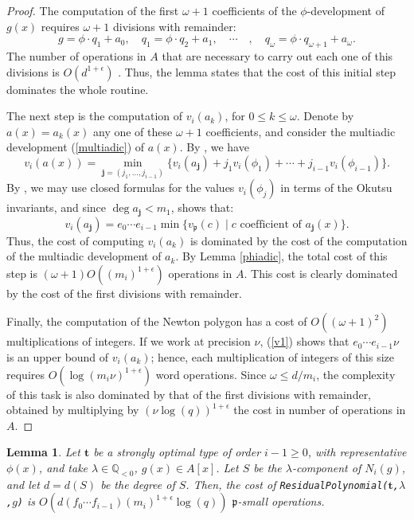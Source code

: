 \documentclass{amsart}
\newtheorem{lemma}[theorem]{Lemma}
\begin{document}
\begin{proof}
The computation of the first $\omega+1$ coefficients of the $\phi$-development of $g(x)$ requires $\omega+1$ divisions with remainder:
$$
g=\phi\cdot q_1+a_0,\quad
q_1=\phi\cdot q_2+a_1,\quad
\cdots\quad,\quad 
q_\omega=\phi\cdot q_{\omega+1}+a_\omega.
$$
The number of operations in $A$ that are necessary to carry out each one of this divisions is $O(d^{1+\epsilon})$ \cite[Thm. 9.6]{vzGG}. Thus, the lemma states that the cost of this initial step dominates the whole routine.
 
The next step is the computation of $v_i(a_k)$, for $0\le k\le \omega$. Denote by $a(x)=a_k(x)$ any one of these $\omega+1$ coefficients, and consider the multiadic development (\ref{multiadic}) of $a(x)$.
By \cite[Lem. 4.2]{bases}, we have 
\begin{equation}\label{v1}
v_i(a(x))=\min_{{\mathbf{j}}=(j_1,\dots,j_{i-1})}\{v_i(a_{\mathbf{j}})+j_1v_i(\phi_1)+\cdots+j_{i-1}v_i(\phi_{i-1})\}.
\end{equation}
By \cite[Prop. 2.15]{HN}, we may use closed formulas for the values $v_i(\phi_j)$ in terms of the Okutsu invariants, and since $\deg a_{\mathbf{j}}<m_1$, \cite[Prop. 2.7]{HN} shows that:
$$
v_i(a_{\mathbf{j}})=e_0\cdots e_{i-1}\min\{v_{\mathfrak{p}}(c)\mid c\mbox{ coefficient of }a_{\mathbf{j}}(x)\}. 
$$
Thus, the cost of computing $v_i(a_k)$ is dominated by the cost of the computation of the multiadic development of $a_k$. By Lemma \ref{phiadic}, the total cost of this step  is $(\omega+1)O\left((m_i)^{1+\epsilon}\right)$ operations in $A$.  This cost is clearly dominated by the cost of the first divisions with remainder.

Finally, the computation of the Newton polygon has a cost of $O((\omega+1)^2)$ multiplications of integers. If we work at precision $\nu$, (\ref{v1}) shows that $e_0\cdots e_{i-1}\nu$ is an upper bound of $v_i(a_k)$; hence,  each multiplication of integers of this size requires $O(\log(m_i\nu)^{1+\epsilon})$ word operations. Since $\omega\le d/m_i$, the complexity of this task is also dominated by that of the first divisions with remainder, obtained by multiplying by $(\nu\log(q))^{1+\epsilon}$ the cost in number of operations in $A$.
\end{proof}

\begin{lemma}\label{ResidualPolynomial}
Let ${\mathbf{t}}$ be a strongly optimal type of order $i-1\ge0$, with representative $\phi(x)$, and take $\lambda\in{\mathbb Q}_{<0}$, $g(x)\in A[x]$. Let $S$ be the $\lambda$-component of $N_i(g)$, and let $d=d(S)$ be the degree of $S$. Then, the cost of {\tt ResidualPolynomial(${\mathbf{t}}$,$\lambda$,$g$)} is
$O\left(d(f_0\cdots f_{i-1})(m_i)^{1+\epsilon}\log(q)\right)$ ${\mathfrak{p}}$-small operations. 
\end{lemma}
\end{document}
